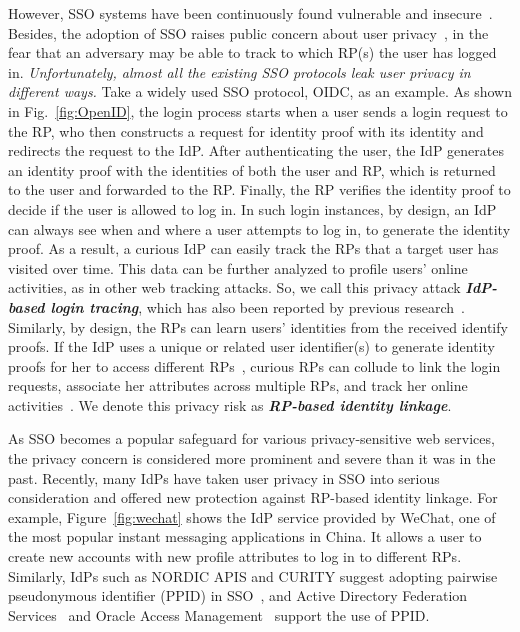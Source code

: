 However, SSO systems have been continuously found vulnerable and insecure~\cite{WangCW12,ccsSunB12,SomorovskyMSKJ12,ArmandoCCCPS13,DiscoveringJCS,dimvaLiM16,WangZLG16,MainkaMS16, MainkaMSW17,YangLCZ18}. Besides, the adoption of SSO raises public concern about user privacy~\cite{maler2008venn,NIST2017draft,BrowserID,SPRESSO}, in the fear that an adversary may be able to track to which RP(s) the user has logged in. {\em Unfortunately, almost all the existing SSO protocols leak user privacy in different ways.} Take a widely used SSO protocol, OIDC, as an example. As shown in Fig.~\ref{fig:OpenID}, the login process starts when a user sends a login request to the RP, %
who then constructs a request for identity proof with its identity and redirects the request to the IdP. %
After authenticating the user, the IdP generates an identity proof with the identities of both the user and RP, %
which is returned to the user and forwarded to the RP. %
Finally, the RP verifies the identity proof to decide if the user is allowed to log in. In such login instances, by design, an IdP can always see when and where a user attempts to log in, to generate the identity proof. As a result, a curious IdP can easily track the RPs that a target user has visited over time. This data can be further analyzed to profile users' online activities, as in other web tracking attacks. So, we call this privacy attack \textbf{\em IdP-based login tracing}, which has also been reported by previous research~\cite{BrowserID,SPRESSO}. Similarly, by design, the RPs can learn users' identities from the received identify proofs. If the IdP uses a unique or related user identifier(s) to generate identity proofs for her to access different RPs~\cite{Google, FirefoxAccount}, curious RPs can collude to link the login requests, associate her attributes across multiple RPs, and track her online activities~\cite{maler2008venn}. We denote this privacy risk as \textbf{\em RP-based identity linkage}.

As SSO becomes a popular safeguard for various privacy-sensitive web services, the privacy concern is considered more prominent and severe than it was in the past. Recently, many IdPs have taken user privacy in SSO into serious consideration and offered new protection against RP-based identity linkage. For example, Figure~\ref{fig:wechat} shows the IdP service provided by WeChat, one of the most popular instant messaging applications in China. It allows a user to create new accounts with new profile attributes to log in to different RPs. Similarly, IdPs such as NORDIC APIS and CURITY suggest adopting pairwise pseudonymous identifier (PPID) in SSO~\cite{Nordic, Curity}, and Active Directory Federation Services~\cite{MS} and Oracle Access Management~\cite{Oracle} support the use of PPID.

